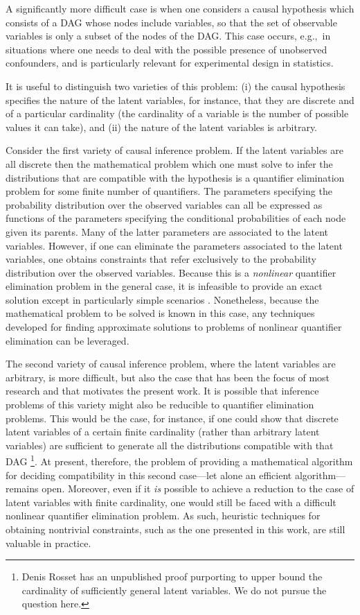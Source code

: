 A significantly more difficult case is when one considers a causal hypothesis which consists of a DAG whose nodes include  variables, so that the set of observable variables is only a subset of the nodes of the DAG. This case occurs, e.g.,~in situations where one needs to deal with the possible presence of unobserved confounders, and is particularly relevant for experimental design in statistics. 

It is useful to distinguish two varieties of this problem: (i) the causal hypothesis specifies the nature of the latent variables, for instance, that they are discrete and of a particular cardinality (the cardinality of a variable is the number of possible values it can take), and (ii) the nature of the latent variables is arbitrary.  

Consider the first variety of causal inference problem.  If the latent variables are all discrete then the mathematical problem which one must solve to infer the distributions that are compatible with the hypothesis is a quantifier elimination problem for some finite number of quantifiers.   The parameters specifying the probability distribution over the observed variables can all be expressed as functions of the parameters specifying the conditional probabilities of each node given its parents.  Many of the latter parameters are associated to the latent variables.  However, if one can eliminate the parameters associated to the latent variables, one obtains constraints that refer exclusively to the probability distribution over the observed variables.  Because this is a {\em nonlinear} quantifier elimination problem in the general case, it is infeasible to provide an exact solution except in particularly simple scenarios \cite{LeeSpekkens}.  Nonetheless, because the mathematical problem to be solved is known in this case, any techniques developed for finding approximate solutions to problems of nonlinear quantifier elimination can be leveraged.

The second variety of causal inference problem, where the latent variables are arbitrary, is more difficult, but also the case that has been the focus of most research and that motivates the present work. It is possible that inference problems of this variety might also be reducible to quantifier elimination problems. This would be the case, for instance, if one could show that discrete latent variables of a certain finite cardinality (rather than arbitrary latent variables) are sufficient to generate all the distributions compatible with that DAG \footnote{Denis Rosset has an unpublished proof purporting to upper bound the cardinality of sufficiently general latent variables. We do not pursue the question here.}. At present, therefore, the problem of providing a mathematical algorithm for deciding compatibility in this second case---let alone an efficient algorithm---remains open.  Moreover, even if it {\em is} possible to achieve a reduction to the case of latent variables with finite cardinality, one would still be faced with a difficult nonlinear quantifier elimination problem.  As such, heuristic techniques for obtaining nontrivial constraints, such as the one presented in this work, are still valuable in practice. 

